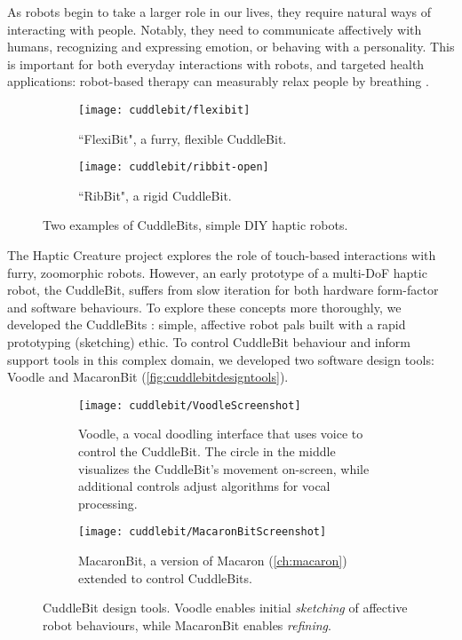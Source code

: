 As robots begin to take a larger role in our lives, they require natural ways of interacting with people.
Notably, they need to communicate affectively with humans, recognizing and expressing emotion, or behaving with a  personality.
This is important for both everyday interactions with robots, and targeted health applications: robot-based therapy can measurably relax people by breathing \cite{Sefidgar2016}.



\begin{figure}[htbp] %
   \centering
      \begin{subfigure}{0.5\textwidth}
   	   \texttt{[image: cuddlebit/flexibit]} 
	      \caption{``FlexiBit", a furry, flexible CuddleBit.}
	      \label{fig:flexibit}
   \end{subfigure}
   \qquad
   \begin{subfigure}{0.4\textwidth}
   	   \texttt{[image: cuddlebit/ribbit-open]} 
	      \caption{``RibBit", a rigid CuddleBit.}
	      \label{fig:ribbit}
   \end{subfigure}
   \caption{Two examples of CuddleBits, simple DIY haptic robots.}
   \label{fig:cuddlebits}
\end{figure}



The Haptic Creature project \cite{Yohanan2011} explores the role of touch-based interactions with furry, zoomorphic robots.
However, an early prototype of a multi-DoF haptic robot, the CuddleBit, suffers from slow iteration for both hardware form-factor and software behaviours.
To explore these concepts more thoroughly, we developed the CuddleBits \cite{cang2015cuddlebits}: simple, affective robot pals built with a rapid prototyping (sketching) ethic.
To control CuddleBit behaviour and inform \haxd support tools in this complex domain, we developed two software design tools: Voodle and MacaronBit (\autoref{fig:cuddlebitdesigntools}).

\begin{figure}[htbp] %
   \centering
      \begin{subfigure}{\textwidth}
   	   \texttt{[image: cuddlebit/VoodleScreenshot]} 
	      \caption{Voodle, a vocal doodling interface that uses voice to control the CuddleBit. The circle in the middle visualizes the CuddleBit's movement on-screen, while  additional controls adjust algorithms for vocal processing.}
	      \label{fig:voodle}
   \end{subfigure}
   \qquad
   \begin{subfigure}{\textwidth}
   	   \texttt{[image: cuddlebit/MacaronBitScreenshot]} 
	      \caption{MacaronBit, a version of Macaron (\autoref{ch:macaron}) extended to control CuddleBits.}
	      \label{fig:macaronbit}
   \end{subfigure}
   \caption{CuddleBit design tools. Voodle enables initial \emph{sketching} of affective robot behaviours, while MacaronBit enables \emph{refining}.}
   \label{fig:cuddlebitdesigntools}
\end{figure}

